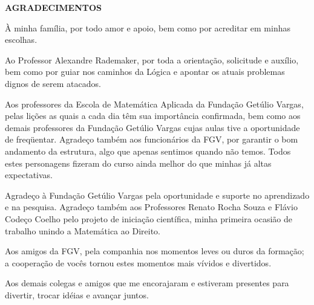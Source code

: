 \documentclass[12pt, a4paper, twoside]{article}
\theoremstyle{definition}
\begin{document}
\newpage
\thispagestyle{empty}

\begin{center}
	\textbf{AGRADECIMENTOS}
\end{center}


À minha família, por todo amor e apoio, bem como por acreditar em minhas escolhas.

Ao Professor Alexandre Rademaker, por toda a orientação, solicitude e auxílio, bem como por guiar nos caminhos da Lógica e apontar os atuais problemas dignos de serem atacados.

Aos professores da Escola de Matemática Aplicada da Fundação Getúlio Vargas, pelas lições as quais a cada dia têm sua importância confirmada, bem como aos demais professores da Fundação Getúlio Vargas cujas aulas tive a oportunidade de freqüentar. Agradeço também aos funcionários da FGV, por garantir o bom andamento da estrutura, algo que apenas sentimos quando não temos. Todos estes personagens fizeram do curso ainda melhor do que minhas já altas expectativas.

Agradeço à Fundação Getúlio Vargas pela oportunidade e suporte no aprendizado e na pesquisa. Agradeço também aos Professores Renato Rocha Souza e Flávio Codeço Coelho pelo projeto de iniciação científica, minha primeira ocasião de trabalho unindo a Matemática ao Direito.

Aos amigos da FGV, pela companhia nos momentos leves ou duros da formação; a cooperação de vocês tornou estes momentos mais vívidos e divertidos.

Aos demais colegas e amigos que me encorajaram e estiveram presentes para divertir, trocar idéias e avançar juntos.
\clearpage

\newpage
\thispagestyle{empty}

\vfill
\vspace*{0.7\textheight}
\begin{flushright}


	\textsl{}

	
\end{flushright}
\end{document}
